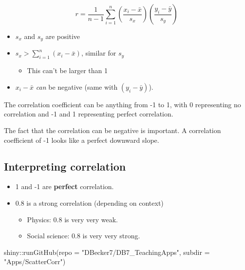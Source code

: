 \documentclass[
  letterpaper,
  DIV=11,
  numbers=noendperiod]{scrreprt}
\newenvironment{Shaded}{\begin{snugshade}}{\end{snugshade}}
\newcommand{\AttributeTok}[1]{\textcolor[rgb]{0.40,0.45,0.13}{#1}}
\newcommand{\FunctionTok}[1]{\textcolor[rgb]{0.28,0.35,0.67}{#1}}
\newcommand{\NormalTok}[1]{\textcolor[rgb]{0.00,0.23,0.31}{#1}}
\newcommand{\SpecialCharTok}[1]{\textcolor[rgb]{0.37,0.37,0.37}{#1}}
\newcommand{\StringTok}[1]{\textcolor[rgb]{0.13,0.47,0.30}{#1}}
\providecommand{\tightlist}{%
  \setlength{\itemsep}{0pt}\setlength{\parskip}{0pt}}\usepackage{longtable,booktabs,array}
\begin{document}
\[
r = \frac{1}{n-1}\sum_{i=1}^n\left(\frac{x_i - \bar x}{s_x}\right)\left(\frac{y_i - \bar y}{s_y}\right)
\]

\begin{itemize}
\tightlist
\item
  \(s_x\) and \(s_y\) are positive
\item
  \(s_x > \sum_{i=1}^n(x_i - \bar x)\), similar for \(s_y\)

  \begin{itemize}
  \tightlist
  \item
    This can't be larger than 1
  \end{itemize}
\item
  \(x_i - \bar x\) \emph{can} be negative (same with \((y_i-\bar y)\)).
\end{itemize}

The correlation coefficient can be anything from -1 to 1, with 0
representing no correlation and -1 and 1 representing perfect
correlation.

The fact that the correlation can be negative is important. A
correlation coefficient of -1 looks like a perfect downward slope.

\hypertarget{interpreting-correlation}{%
\subsection{Interpreting correlation}\label{interpreting-correlation}}

\begin{itemize}
\tightlist
\item
  1 and -1 are \textbf{perfect} correlation.
\item
  0.8 is a strong correlation (depending on context)

  \begin{itemize}
  \tightlist
  \item
    Physics: 0.8 is very very weak.
  \item
    Social science: 0.8 is very very strong.
  \end{itemize}
\end{itemize}

\begin{Shaded}
\begin{Highlighting}[]
\NormalTok{shiny}\SpecialCharTok{::}\FunctionTok{runGitHub}\NormalTok{(}\AttributeTok{repo =} \StringTok{"DBecker7/DB7\_TeachingApps"}\NormalTok{, }
    \AttributeTok{subdir =} \StringTok{"Apps/ScatterCorr"}\NormalTok{)}
\end{Highlighting}
\end{Shaded}
\end{document}
